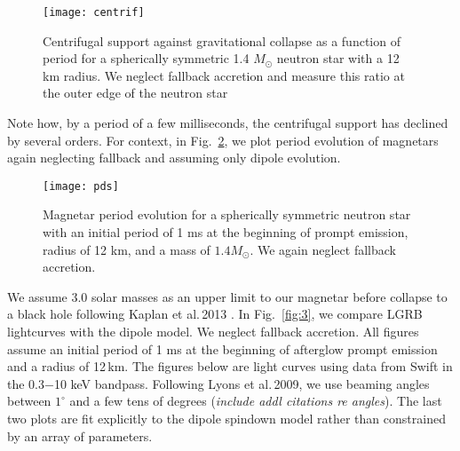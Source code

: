 \documentclass{article}
\begin{document}
\begin{figure}[h!]
\centering
\texttt{[image: centrif]}
\caption{Centrifugal support against gravitational collapse as a function of period for a spherically symmetric 1.4 $M_{\odot}$ neutron star with a 12 km radius. We neglect fallback accretion and measure this ratio at the outer edge of the neutron star}
\label{fig:1}
\end{figure}

Note how, by a period of a few milliseconds, the centrifugal support has declined by several orders. For context, in Fig.~\ref{fig:2}, we plot period evolution of magnetars again neglecting fallback and assuming only dipole evolution.

\begin{figure}[h!]
\centering
\texttt{[image: pds]}
\caption{Magnetar period evolution for a spherically symmetric neutron star with an initial period of 1 ms at the beginning of prompt emission, radius of 12 km, and a mass of $1.4 M_{\odot}$. We again neglect fallback accretion.}
\label{fig:2}
\end{figure}

We assume 3.0 solar masses as an upper limit to our magnetar before collapse to a black hole following Kaplan et al.\,2013 \cite{Kaplan:2013wra}. In Fig.~\ref{fig:3}, we compare LGRB lightcurves with the dipole model. We neglect fallback accretion. All figures assume an initial period of 1 ms at the beginning of afterglow prompt emission and a radius of 12\,km. The figures below are light curves using data from Swift in the 0.3$-$10 keV bandpass. Following Lyons et al.\,2009, we use beaming angles between $1^{\circ}$ and a few tens of degrees \cite{Lyons:2009ka} (\textit{include addl citations re angles}).  The last two plots are fit explicitly to the dipole spindown model rather than constrained by an array of parameters.
\end{document}
